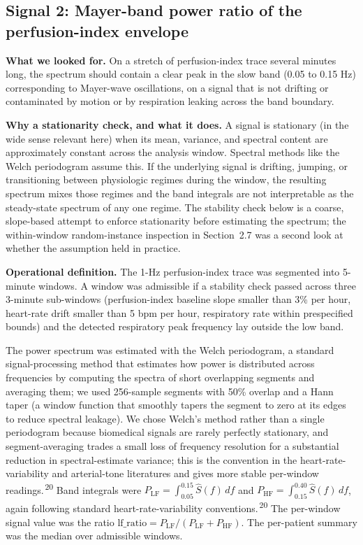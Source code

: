 \documentclass[twocolumn,letterpaper,10pt]{article}
\renewcommand{\cite}[1]{\textsuperscript{\,#1}}
\begin{document}
\subsection{Signal 2: Mayer-band power ratio of the perfusion-index envelope}

\textbf{What we looked for.} On a stretch of perfusion-index trace several minutes long, the spectrum should contain a clear peak in the slow band (0.05 to 0.15 Hz) corresponding to Mayer-wave oscillations, on a signal that is not drifting or contaminated by motion or by respiration leaking across the band boundary.

\textbf{Why a stationarity check, and what it does.} A signal is stationary (in the wide sense relevant here) when its mean, variance, and spectral content are approximately constant across the analysis window. Spectral methods like the Welch periodogram assume this. If the underlying signal is drifting, jumping, or transitioning between physiologic regimes during the window, the resulting spectrum mixes those regimes and the band integrals are not interpretable as the steady-state spectrum of any one regime. The stability check below is a coarse, slope-based attempt to enforce stationarity before estimating the spectrum; the within-window random-instance inspection in Section~2.7 was a second look at whether the assumption held in practice.

\textbf{Operational definition.} The 1-Hz perfusion-index trace was segmented into 5-minute windows. A window was admissible if a stability check passed across three 3-minute sub-windows (perfusion-index baseline slope smaller than 3\% per hour, heart-rate drift smaller than 5 bpm per hour, respiratory rate within prespecified bounds) and the detected respiratory peak frequency lay outside the low band.

The power spectrum was estimated with the Welch periodogram, a standard signal-processing method that estimates how power is distributed across frequencies by computing the spectra of short overlapping segments and averaging them; we used 256-sample segments with 50\% overlap and a Hann taper (a window function that smoothly tapers the segment to zero at its edges to reduce spectral leakage). We chose Welch's method rather than a single periodogram because biomedical signals are rarely perfectly stationary, and segment-averaging trades a small loss of frequency resolution for a substantial reduction in spectral-estimate variance; this is the convention in the heart-rate-variability and arterial-tone literatures and gives more stable per-window readings.\cite{20} Band integrals were $P_{\mathrm{LF}} = \int_{0.05}^{0.15} \hat{S}(f)\,df$ and $P_{\mathrm{HF}} = \int_{0.15}^{0.40} \hat{S}(f)\,df$, again following standard heart-rate-variability conventions.\cite{20} The per-window signal value was the ratio $\mathrm{lf\_ratio} = P_{\mathrm{LF}}/(P_{\mathrm{LF}}+P_{\mathrm{HF}})$. The per-patient summary was the median over admissible windows.
\end{document}
